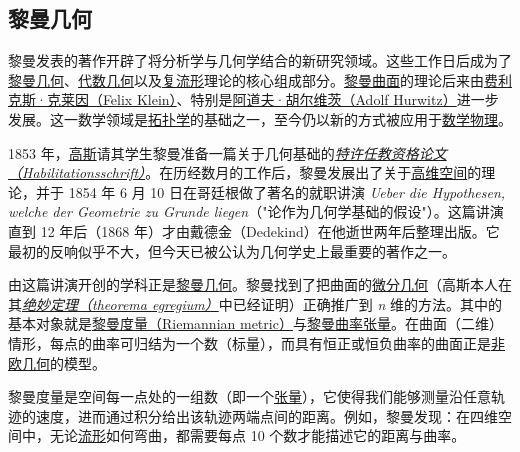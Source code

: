 \subsection{黎曼几何}\label{Riemannian_geometry}

黎曼发表的著作开辟了将分析学与几何学结合的新研究领域。这些工作日后成为了\href{https://en.wikipedia.org/wiki/Riemannian_geometry}{黎曼几何}、\href{https://en.wikipedia.org/wiki/Algebraic_geometry}{代数几何}以及\href{https://en.wikipedia.org/wiki/Complex_manifold}{复流形}理论的核心组成部分。\href{https://en.wikipedia.org/wiki/Riemann_surface}{黎曼曲面}的理论后来由\href{https://en.wikipedia.org/wiki/Felix_Klein}{费利克斯·克莱因（Felix Klein）}、特别是\href{https://en.wikipedia.org/wiki/Adolf_Hurwitz}{阿道夫·胡尔维茨（Adolf Hurwitz）}进一步发展。这一数学领域是\href{https://en.wikipedia.org/wiki/Topology}{拓扑学}的基础之一，至今仍以新的方式被应用于\href{https://en.wikipedia.org/wiki/Mathematical_physics}{数学物理}。

1853 年，\href{https://en.wikipedia.org/wiki/Carl_Friedrich_Gauss}{高斯}请其学生黎曼准备一篇关于几何基础的\emph{\href{https://en.wikipedia.org/wiki/Habilitationsschrift}{特许任教资格论文（Habilitationsschrift）}}。在历经数月的工作后，黎曼发展出了关于\href{https://en.wikipedia.org/wiki/Higher_dimensions}{高维空间}的理论，并于 1854 年 6 月 10 日在哥廷根做了著名的就职讲演 \emph{Ueber die Hypothesen, welche der Geometrie zu Grunde liegen}（"论作为几何学基础的假设"）。这篇讲演直到 12 年后（1868 年）才由戴德金（Dedekind）在他逝世两年后整理出版。它最初的反响似乎不大，但今天已被公认为几何学史上最重要的著作之一。

由这篇讲演开创的学科正是\href{https://en.wikipedia.org/wiki/Riemannian_geometry}{黎曼几何}。黎曼找到了把曲面的\href{https://en.wikipedia.org/wiki/Differential_geometry}{微分几何}（高斯本人在其\emph{\href{https://en.wikipedia.org/wiki/Theorema_egregium}{绝妙定理（theorema egregium）}}中已经证明）正确推广到 \emph{n} 维的方法。其中的基本对象就是\href{https://en.wikipedia.org/wiki/Riemannian_metric}{黎曼度量（Riemannian metric）}与\href{https://en.wikipedia.org/wiki/Riemann_curvature_tensor}{黎曼曲率张量}。在曲面（二维）情形，每点的曲率可归结为一个数（标量），而具有恒正或恒负曲率的曲面正是\href{https://en.wikipedia.org/wiki/Non-Euclidean_geometry}{非欧几何}的模型。

黎曼度量是空间每一点处的一组数（即一个\href{https://en.wikipedia.org/wiki/Tensor}{张量}），它使得我们能够测量沿任意轨迹的速度，进而通过积分给出该轨迹两端点间的距离。例如，黎曼发现：在四维空间中，无论\href{https://en.wikipedia.org/wiki/Manifold}{流形}如何弯曲，都需要每点 10 个数才能描述它的距离与曲率。


